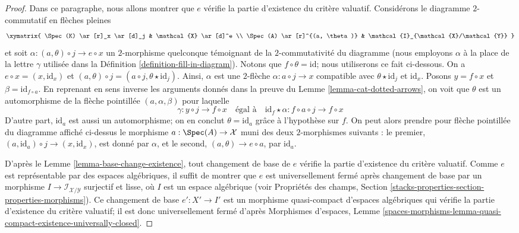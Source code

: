 \begin{proof}
\medskip\noindent
Dans ce paragraphe, nous allons montrer que $e$ vérifie la partie
d'existence du critère valuatif. Considérons le diagramme $2$-commutatif en flèches pleines
$$
\xymatrix{
\Spec(K) \ar[r]_x \ar[d]_j & \mathcal{X} \ar[d]^e \\
\Spec(A) \ar[r]^{(a, \theta)} & \mathcal{I}_{\mathcal{X}/\mathcal{Y}}
}
$$
et soit $\alpha : (a, \theta) \circ j \to e \circ x$ un $2$-morphisme quelconque
témoignant de la $2$-commutativité du diagramme (nous employons $\alpha$ à la place
de la lettre $\gamma$ utilisée dans la Définition \ref{definition-fill-in-diagram}).
Notons que $f \circ \theta = \text{id}$; nous utiliserons ce fait ci-dessous.
On a $e \circ x = (x, \text{id}_x)$ et
$(a, \theta) \circ j = (a \circ j, \theta \star \text{id}_j)$.
Ainsi, $\alpha$ est une $2$-flèche $\alpha : a \circ j \to x$
compatible avec $\theta \star \text{id}_j$ et $\text{id}_x$.
Posons $y = f \circ x$ et $\beta = \text{id}_{f \circ a}$.
En reprenant en sens inverse les arguments donnés dans la preuve du
Lemme \ref{lemma-cat-dotted-arrows},
on voit que $\theta$ est un automorphisme de la
flèche pointillée $(a, \alpha, \beta)$ pour laquelle
$$
\gamma : y \circ j \to f \circ x
\quad\text{égal à}\quad
\text{id}_f \star \alpha : f \circ a \circ j \to f \circ x
$$
D'autre part, $\text{id}_a$ est aussi un automorphisme; on en conclut
$\theta = \text{id}_a$ grâce à l'hypothèse sur $f$.
On peut alors prendre pour flèche pointillée du diagramme affiché ci-dessus
le morphisme $a : \Spec(A) \to \mathcal{X}$ muni des deux $2$-morphismes suivants :
le premier, $(a, \text{id}_a) \circ j \to (x, \text{id}_x)$, est donné par $\alpha$,
et le second, $(a, \theta) \to e \circ a$, par $\text{id}_a$.

\medskip\noindent
D'après le Lemme \ref{lemma-base-change-existence}, tout changement de base de $e$
vérifie la partie d'existence du critère valuatif.
Comme $e$ est représentable par des espaces algébriques, il suffit de
montrer que $e$ est universellement fermé après changement de base
par un morphisme $I \to \mathcal{I}_{\mathcal{X}/\mathcal{Y}}$
surjectif et lisse, où $I$ est un espace algébrique
(voir Propriétés des champs, Section
\ref{stacks-properties-section-properties-morphisms}).
Ce changement de base $e' : X' \to I'$ est un
morphisme quasi-compact d'espaces algébriques qui
vérifie la partie d'existence du critère valuatif;
il est donc universellement fermé d'après
Morphismes d'espaces, Lemme
\ref{spaces-morphisms-lemma-quasi-compact-existence-universally-closed}.
\end{proof}






